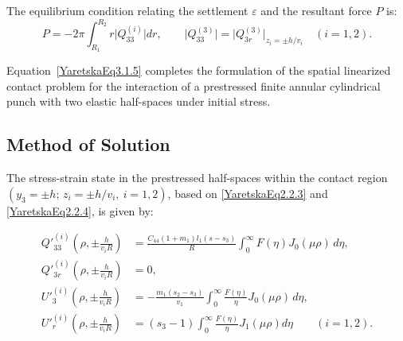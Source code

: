 The equilibrium condition relating the settlement $\varepsilon$ and the resultant force $P$ is:
\begin{equation} \label{YaretskaEq3.1.5}
	P = -2\pi \int_{R_1}^{R_2} r \big|Q^{(i)}_{33}\big| dr, \qquad \big|Q^{(3)}_{33}\big| = \big|Q^{(3)}_{3r}\big|_{z_i = \pm h / v_i} \quad (i = 1,2).
\end{equation}

Equation~\eqref{YaretskaEq3.1.5} completes the formulation of the spatial linearized contact problem for the interaction of a prestressed finite annular cylindrical punch with two elastic half-spaces under initial stress.

\subsection{Method of Solution}

The stress-strain state in the prestressed half-spaces within the contact region $(y_3 = \pm h;\, z_i = \pm h/v_i,\ i=1,2)$, based on \eqref{YaretskaEq2.2.3} and \eqref{YaretskaEq2.2.4}, is given by:

\begin{equation}\label{YaretskaEq3.2.1}
\begin{aligned}
	Q'^{(i)}_{33}\left(\rho, \pm \frac{h}{v_i R} \right) &= \frac{C_{44}(1 + m_1) l_1 (s - s_3)}{R} \int_0^\infty F(\eta) J_0(\mu \rho) \, d\eta,
	\\
	Q'^{(i)}_{3r}\left(\rho, \pm \frac{h}{v_i R} \right) &= 0, 
	 \\
	U'^{(i)}_3\left(\rho, \pm \frac{h}{v_i R} \right) &= -\frac{m_1 (s_2 - s_3)}{v_1} \int_0^\infty \frac{F(\eta)}{\eta} J_0(\mu \rho) \, d\eta,  
	\\
	U'^{(i)}_r\left(\rho, \pm \frac{h}{v_i R} \right) &= (s_3 - 1) \int_0^\infty \frac{F(\eta)}{\eta} J_1(\mu \rho)  d\eta \qquad (i=1,2). 
\end{aligned}
\end{equation}

